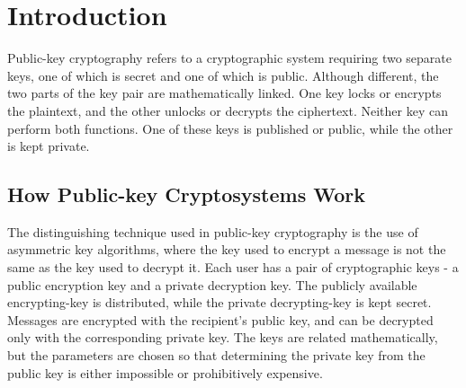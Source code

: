 \documentclass[12pt]{article} %
\begin{document}
\begin{titlepage}
\begin{center}
\begin{minipage}{0.8\textwidth}
\begin{flushleft}
\end{flushleft}
\end{minipage}
\vfill

{\large}

\end{center}

\end{titlepage}



\maketitle
\setcounter{secnumdepth}{1}

\section{Introduction}
Public-key cryptography refers to a cryptographic system requiring two separate keys, one of which is secret and one of which is public. Although different, the two parts of the key pair are mathematically linked. One key locks or encrypts the plaintext, and the other unlocks or decrypts the ciphertext. Neither key can perform both functions. One of these keys is published or public, while the other is kept private.
\subsection{How Public-key Cryptosystems Work}
The distinguishing technique used in public-key cryptography is the use of asymmetric key algorithms, where the key used to encrypt a message is not the same as the key used to decrypt it. Each user has a pair of cryptographic keys - a public encryption key and a private decryption key. The publicly available encrypting-key is distributed, while the private decrypting-key is kept secret. Messages are encrypted with the recipient's public key, and can be decrypted only with the corresponding private key. The keys are related mathematically, but the parameters are chosen so that determining the private key from the public key is either impossible or prohibitively expensive. 
\end{document}
